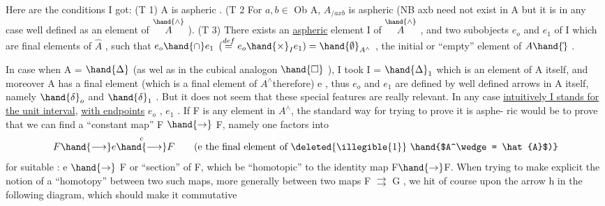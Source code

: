  

Here are the conditions I got:
(T 1) A is aspheric .
(T 2\over{)}{\unsure{)}} For $a,b \in$ Ob A, $A_{/axb}$ is aspheric  (NB axb need not exist in A
but it is in any case well defined as an element of $\overset{\hand{\wedge}}{A}$ ).
(T 3) There exists an \uline{aspheric} element I of $\overset{\hand{\wedge}}{A}$ , and two subobjects
$e_o$ and $e_1$ of I which are final elements of $\hat{A}$ , such that
$e_o \hand{\cap} e_1$ $(\overset{def}{=} e_o \hand{\times}_I e_1) = \hand{\emptyset}_{A^\wedge}$ , the initial or ``empty'' element of $A\hand{\hat{}}$ .

In case when A = $\hand{\Delta}$ (as wel as in the cubical analogon $\hand{\Box}$ ), I took
I = $\hand{\Delta}_1$ which is an element of A itself, and  moreover A has a final
element (which is a final element of $A^\wedge$\hand{/}therefore) e , thus $e_o$ and $e_1$ are
defined by well defined arrows in A itself, namely $\hand{\delta}_o$ and $\hand{\delta}_1$ . But it
does not seem that these special features are really relevant. In any case
\uline{intuitively I stands for the unit interval}, \uline{with endpoints} $e_o$ , $e_1$ . If
F is any element in $A^\wedge$, the standard way for trying to prove it is asphe-%
ric would be to prove that we can find a ``constant map'' F $\hand{\to}$ F, namely one
 factors into
\[ F \hand{\longrightarrow} e \overset{c}{\hand{\longrightarrow}} F \qquad \text{(e the final element of \deleted{\illegible{1}} \hand{$A^\wedge = \hat{A}$)}} \]
for suitable  : e $\hand{\to}$ F or ``section'' of F, which be ``homotopic'' to the
identity map F$\hand{\to}$F. When trying to make explicit the notion of a ``homotopy''
 between two such maps, more generally between two  maps F $\rightrightarrows$ G , we
hit of course upon the arrow h in the following diagram, which should
make it commutative

